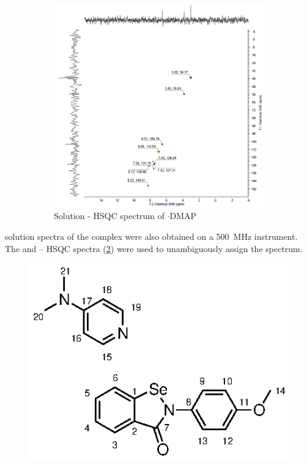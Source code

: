 \begin{refsection}
\begin{figure}
  \begin{subfigure}[t]{\linewidth}
  \centering
  \includegraphics[width=0.75\linewidth]{Figures/ebs-4ome-dmap-sol-hsqc.pdf}
  \caption{Solution - HSQC spectrum of $ \cdot $DMAP}\label{fig:ebs-4ome-dmap-sol-hsqc}
  \end{subfigure}
  \caption[Solution NMR spectra of \texorpdfstring{$ \cdot $}{.}DMAP.]{}\label{fig:ebs-4ome-dmap-sol}
\end{figure}

 solution spectra of the complex were also obtained on a 500~MHz instrument.
The  and -- HSQC spectra (\cref{fig:ebs-4ome-dmap-sol}) were used to unambiguously assign the  spectrum.

\begin{figure}
  \centering
  \includegraphics[scale=0.74]{Figures/numbering.eps}


\end{figure}
\end{refsection}
